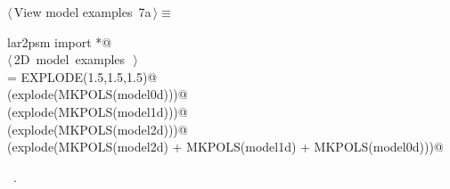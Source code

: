 \documentclass[11pt,oneside]{article}	%
\begin{document}
\begin{flushleft} \small
\begin{minipage}{\linewidth} \label{scrap21}
\protect{}$\langle\,$View model examples\nobreak\ {\footnotesize 7a}$\,\rangle\equiv$
\vspace{-1ex}
\begin{list}{}{} \item
\mbox{}\verb@from lar2psm import *@\\
\mbox{}\verb@@\hbox{$\langle\,$2D model examples\nobreak\ {\footnotesize {}}$\,\rangle$}\verb@@\\
\mbox{}\verb@explode = EXPLODE(1.5,1.5,1.5)@\\
\mbox{}\verb@VIEW(explode(MKPOLS(model0d)))@\\
\mbox{}\verb@VIEW(explode(MKPOLS(model1d)))@\\
\mbox{}\verb@VIEW(explode(MKPOLS(model2d)))@\\
\mbox{}\verb@VIEW(explode(MKPOLS(model2d) + MKPOLS(model1d) + MKPOLS(model0d)))@\\
\mbox{}\verb@@{\NWsep}
\end{list}
\vspace{-1ex}
\footnotesize\addtolength{\baselineskip}{-1ex}
\begin{list}{}{\setlength{\itemsep}{-\parsep}\setlength{\itemindent}{-\leftmargin}}
\item \NWtxtMacroRefIn\ .
\end{list}
\end{minipage}\\[4ex]
\end{flushleft}
\end{document}
